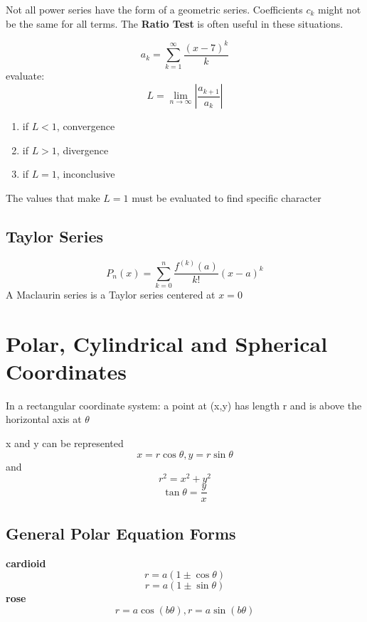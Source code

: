 \hfill
\hfill
\hfill

Not all power series have the form of a geometric series. Coefficients $c_{k}$ might not be the same for all terms. The \textbf{Ratio Test} is often useful in these situations.

\begin{equation}
	\label{}
	a_{k}=\sum_{k=1}^{\infty} \frac{(x-7)^{k}}{k}	
\end{equation}
evaluate:
\begin{equation}
	\label{}
L=\lim_{n\to\infty}|\frac{a_{k+1}}{a_{k}}|
\end{equation}
\begin{enumerate}
	\item if $L<1$, convergence
	\item if $L>1$, divergence
	\item if $L=1$, inconclusive
\end{enumerate}

The values that make $L=1$ must be evaluated to find specific character


\subsection{Taylor Series}

\begin{equation}
	\label{}
P_{n}(x)=\sum_{k=0}^{n}\frac{f^{(k)}(a)}{k!}(x-a)^{k}
\end{equation}
A Maclaurin series is a Taylor series centered at $x=0$



\section{Polar, Cylindrical and Spherical Coordinates}

In a rectangular coordinate system:
a point at (x,y) has length r and is above the horizontal axis at $\theta$


x and y can be represented
\begin{equation}
	\label{}
x=r\cos\theta, y=r\sin\theta	
\end{equation}
and
\begin{equation}
	\label{}
r^{2}=x^{2}+y^{2}	
\end{equation}
\begin{equation}
	\label{}
\tan\theta=\frac{y}{x}	
\end{equation}

\subsection{General Polar Equation Forms}
\textbf{cardioid}
\begin{equation}
	\label{}	
r=a(1\pm \cos\theta)
\end{equation}
\begin{equation}
	\label{}
r=a(1\pm\sin\theta)	
\end{equation}
\textbf{rose}
\begin{equation}
	\label{}
r=a\cos(b\theta), r=a\sin(b\theta)	
\end{equation}


